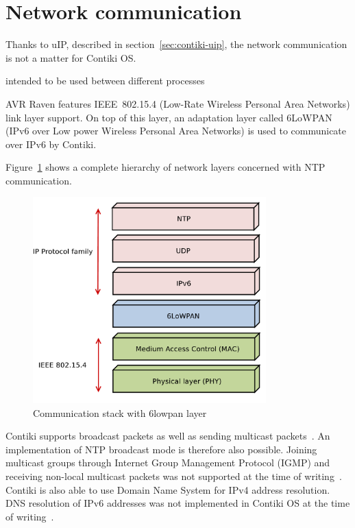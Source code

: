 
\section{Network communication}
Thanks to uIP, described in section~\ref{sec:contiki-uip},
the network communication is not a matter for Contiki OS.

intended to be used between different processes

AVR Raven features IEEE~802.15.4 (Low-Rate Wireless Personal Area Networks) link layer support.
On top of this layer, an adaptation layer called 6LoWPAN (IPv6 over Low power Wireless Personal Area Networks)
is used to communicate over IPv6 by Contiki.

Figure~\ref{fig:design-6lowpan} shows a complete hierarchy of network layers
concerned with NTP communication.
\begin{figure}
  \centering
  \includegraphics[width=9cm,keepaspectratio]{fig/6lowpan.pdf}
  \caption{Communication stack with 6lowpan layer}
  \label{fig:design-6lowpan}
  \bigskip
\end{figure}

Contiki supports broadcast packets as well as sending multicast packets~\cite{contiki-docs}.
An implementation of NTP broadcast mode is therefore also possible.
Joining multicast groups through Internet Group Management Protocol (IGMP)
and receiving non-local multicast packets
was not supported at the time of writing~\cite{contiki-docs}.
Contiki is also able to use Domain Name System for IPv4 address resolution.
DNS resolution of IPv6 addresses was not implemented in Contiki OS
at the time of writing~\cite{contiki-docs}.
